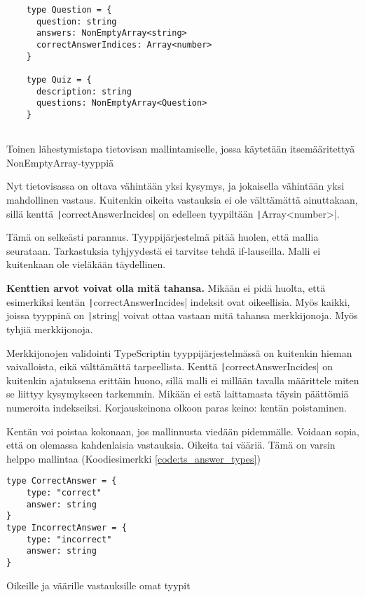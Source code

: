 \begin{code}
    \begin{verbatim}
    type Question = {
      question: string
      answers: NonEmptyArray<string> 
      correctAnswerIndices: Array<number>
    }
    
    type Quiz = {
      description: string
      questions: NonEmptyArray<Question> 
    }
             
    \end{verbatim}
    \caption{Toinen lähestymistapa tietovisan mallintamiselle, jossa käytetään itsemääritettyä NonEmptyArray-tyyppiä}
    \label{code:ts_non_empty_quiz}
\end{code}

Nyt tietovisassa on oltava vähintään yksi kysymys, ja jokaisella vähintään yksi mahdollinen vastaus. Kuitenkin oikeita vastauksia ei ole välttämättä ainuttakaan, sillä kenttä \texttt|correctAnswerIncides| on edelleen tyypiltään \texttt|Array<number>|.

Tämä on selkeästi parannus. Tyyppijärjestelmä pitää huolen, että mallia seurataan. Tarkastuksia tyhjyydestä ei tarvitse tehdä if-lauseilla. Malli ei kuitenkaan ole vieläkään täydellinen.

\textbf{Kenttien arvot voivat olla mitä tahansa.} Mikään ei pidä huolta, että esimerkiksi kentän \texttt|correctAnswerIncides| indeksit ovat oikeellisia. Myös kaikki, joissa tyyppinä on \texttt|string| voivat ottaa vastaan mitä tahansa merkkijonoja. Myös tyhjiä merkkijonoja.

Merkkijonojen validointi TypeScriptin tyyppijärjestelmässä on kuitenkin hieman vaivalloista, eikä välttämättä tarpeellista. Kenttä \texttt|correctAnswerIncides| on kuitenkin ajatuksena erittäin huono, sillä malli ei millään tavalla määrittele miten se liittyy kysymykseen tarkemmin. Mikään ei estä laittamasta täysin päättömiä numeroita \textcite{oikeiksi} indekseiksi. Korjauskeinona olkoon paras keino: kentän poistaminen.

Kentän voi poistaa kokonaan, jos mallinnusta viedään pidemmälle. Voidaan sopia, että on olemassa kahdenlaisia vastauksia. Oikeita tai vääriä. Tämä on varsin helppo mallintaa (Koodiesimerkki \ref{code:ts_answer_types})

\begin{code}
    \begin{verbatim}
type CorrectAnswer = {
    type: "correct"
    answer: string
}
type IncorrectAnswer = {
    type: "incorrect"
    answer: string
}
    \end{verbatim}
    \caption{Oikeille ja väärille vastauksille omat tyypit}
    \label{code:ts_answer_types}
\end{code}


